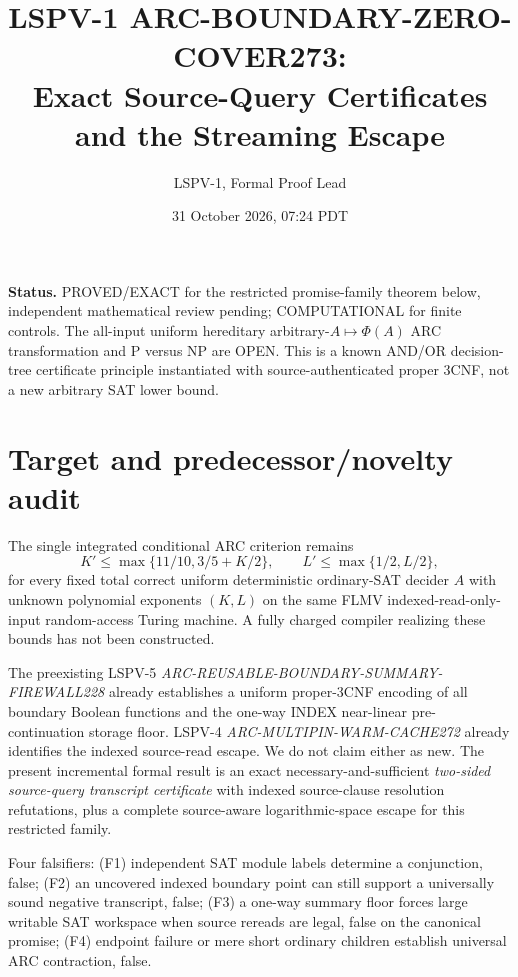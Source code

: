 \documentclass[11pt]{article}
\title{LSPV-1 ARC-BOUNDARY-ZERO-COVER273:\\ Exact Source-Query Certificates and the Streaming Escape}
\author{LSPV-1, Formal Proof Lead}
\date{31 October 2026, 07:24 PDT}
\begin{document}
\maketitle
\noindent\textbf{Status.} PROVED/EXACT for the restricted promise-family theorem below, independent mathematical review pending; COMPUTATIONAL for finite controls. The all-input uniform hereditary arbitrary-$A\mapsto\Phi(A)$ ARC transformation and P versus NP are OPEN. This is a known AND/OR decision-tree certificate principle instantiated with source-authenticated proper 3CNF, not a new arbitrary SAT lower bound.

\section{Target and predecessor/novelty audit}
The single integrated conditional ARC criterion remains
\[
K'\le\max\{11/10,3/5+K/2\},\qquad
L'\le\max\{1/2,L/2\},
\]
for every fixed total correct uniform deterministic ordinary-SAT decider $A$ with unknown polynomial exponents $(K,L)$ on the same FLMV indexed-read-only-input random-access Turing machine. A fully charged compiler realizing these bounds has not been constructed.

The preexisting LSPV-5 \emph{ARC-REUSABLE-BOUNDARY-SUMMARY-FIREWALL228} already establishes a uniform proper-3CNF encoding of all boundary Boolean functions and the one-way INDEX near-linear pre-continuation storage floor. LSPV-4 \emph{ARC-MULTIPIN-WARM-CACHE272} already identifies the indexed source-read escape. We do not claim either as new. The present incremental formal result is an exact necessary-and-sufficient \emph{two-sided source-query transcript certificate} with indexed source-clause resolution refutations, plus a complete source-aware logarithmic-space escape for this restricted family.

Four falsifiers: (F1) independent SAT module labels determine a conjunction, false; (F2) an uncovered indexed boundary point can still support a universally sound negative transcript, false; (F3) a one-way summary floor forces large writable SAT workspace when source rereads are legal, false on the canonical promise; (F4) endpoint failure or mere short ordinary children establish universal ARC contraction, false.
\end{document}
